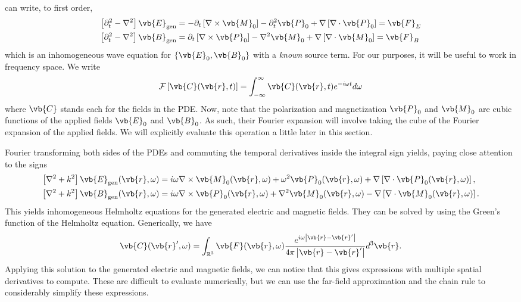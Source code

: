 \documentclass[11pt,SymmetricalJury]{inrsthesis/inrsthesis}
\begin{document}
can write, to first order,
  \begin{subequations}
  \begin{align}
    \left[\partial_t^2-\nabla^2\right]\vb{E}_\text{gen}
                  &= -\partial_t\left[\nabla\times\vb{M}_0\right]-\partial_t^2\vb{P}_0+\nabla\left[\nabla\cdot\vb{P}_0\right]
                  = \vb{F}_E \\
    \left[\partial_t^2-\nabla^2\right]\vb{B}_\text{gen}
                  &= \partial_t\left[\nabla\times\vb{P}_0\right]-\nabla^2\vb{M}_0+\nabla\left[\nabla\cdot\vb{M}_0\right]=\vb{F}_B
  \end{align}
  \end{subequations}
which is an inhomogeneous wave equation for $\left\{\vb{E}_0,\vb{B}_0\right\}$
with a \textit{known} source term. For our purposes, it will be useful to work
in frequency space. We write
  \begin{equation}
    \mathcal{F}\left[\vb{C}(\vb{r},t)\right] = \int_{-\infty}^\infty \vb{C}(\vb{r},t)e^{-i\omega t}d\omega
  \end{equation}
where $\vb{C}$ stands each for the fields in the PDE. Now, note that the polarization
and magnetization $\vb{P}_0$ and $\vb{M}_0$ are cubic functions of the applied fields
$\vb{E}_0$ and $\vb{B}_0$. As such, their Fourier expansion will involve taking
the cube of the Fourier expansion of the applied fields. We will explicitly evaluate
this operation a little later in this section.

Fourier transforming both sides of the PDEs and commuting the temporal derivatives
inside the integral sign yields, paying close attention to the signs
  \begin{subequations}
  \begin{align}
    \left[\nabla^2+k^2\right]\vb{E}_\text{gen}(\vb{r},\omega)
      &= i\omega\nabla\times\vb{M}_0(\vb{r},\omega) + \omega^2 \vb{P}_0(\vb{r},\omega)+\nabla\left[\nabla\cdot\vb{P}_0(\vb{r},\omega)\right], \\
    \left[\nabla^2+k^2\right]\vb{B}_\text{gen}(\vb{r},\omega)
      &= i\omega\nabla\times\vb{P}_0(\vb{r},\omega) + \nabla^2\vb{M}_0(\vb{r},\omega)-\nabla\left[\nabla\cdot\vb{M}_0(\vb{r},\omega)\right].
  \end{align}
  \end{subequations}
This yields inhomogeneous Helmholtz equations for the generated electric and
magnetic fields. They can be solved by using the Green's function of the
Helmholtz equation. Generically, we have
  \begin{equation}
    \vb{C}(\vb{r}',\omega)
      = \int_{\mathbb{R}^3} \vb{F}(\vb{r},\omega)\frac{e^{i\omega\left|\vb{r}-\vb{r}'\right|}}{4\pi\left|\vb{r}-\vb{r}'\right|}d^3\vb{r}.
  \end{equation}
Applying this solution to the generated electric and magnetic fields, we
can notice that this gives expressions with multiple spatial derivatives
to compute. These are difficult to evaluate numerically, but we can use the
far-field approximation and the chain rule to considerably simplify these
expressions.
\end{document}
